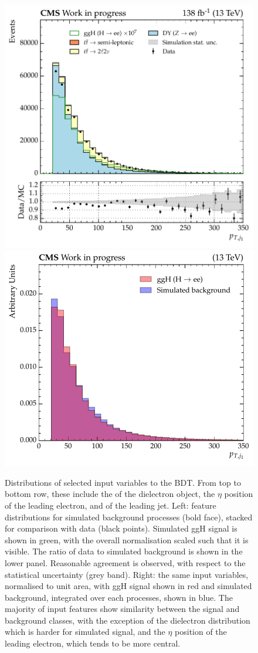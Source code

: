 \begin{figure}[htbp!]
\includegraphics[width =0.403\linewidth]{Figures/Hee/ggH/dataMC/ggH_BDT_pt_reweighted_leadJetPt.pdf}\hfill%
\includegraphics[width =0.454\linewidth]{Figures/Hee/ggH/normed/ggH_BDT_pt_reweighted_leadJetPt_normalised.pdf}\hfill%

\caption[Distributions of selected input variables to the \ggH BDT.]{Distributions of selected input variables to the \ggH BDT. From top to bottom row, these include the \pt of the dielectron object, the $\eta$ position of the leading electron, and \pt of the leading jet. Left: feature distributions for simulated background processes (bold face), stacked for comparison with data (black points). Simulated ggH signal is shown in green, with the overall normalisation scaled such that it is visible. The ratio of data to simulated background is shown in the lower panel. Reasonable agreement is observed, with respect to the statistical uncertainty (grey band). Right: the same input variables, normalised to unit area, with ggH signal shown in red and simulated background, integrated over each processes, shown in blue. The majority of input features show similarity between the signal and background classes, with the exception of the dielectron \pt distribution which is harder for simulated signal, and the $\eta$ position of the leading electron, which tends to be more central.}
\label{fig:ggh_inputs}                                 
\end{figure}   




